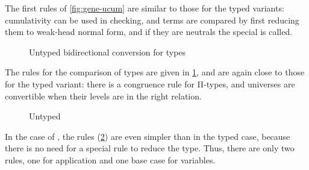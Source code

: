 The first rules of \cref{fig:gene-ucum} are similar to those for the typed variants: cumulativity can be used
in checking, and terms are compared by first reducing them to weak-head normal form, and if they are neutrals
the special  is called.

\begin{figure}[h]
  \ContinuedFloat
  \caption{Untyped bidirectional conversion for types}
  \label{fig:bd-cong-univ}
\end{figure}

The rules for the comparison of types are given in \cref{fig:bd-cong-univ}, and are again
close to those for the typed variant: there is a congruence rule for Π-types,
and universes are convertible when their levels are in the right relation.

\begin{figure}[h]
  \ContinuedFloat
  \caption{Untyped }
  \label{fig:neu-ucomp}
\end{figure}

In the case of , the rules (\cref{fig:neu-ucomp}) are even simpler
than in the typed case, because there is no need for a special rule to reduce the type.
Thus, there are only two rules, one for application and one base case for variables.


